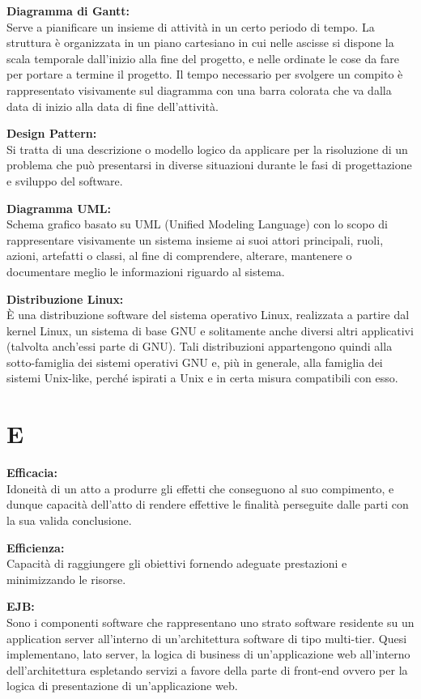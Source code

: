 \documentclass[a4paper, oneside, openany, dvipsnames, table]{article}
\begin{document}
\textbf{Diagramma di Gantt:}\\	Serve a pianificare un insieme di attività in un certo periodo di tempo. La struttura è organizzata in un piano cartesiano in cui nelle ascisse si dispone la scala temporale dall’inizio alla fine del progetto, e nelle ordinate le cose da fare per portare a termine il progetto. Il tempo necessario per svolgere un compito è rappresentato visivamente sul diagramma con una barra colorata che va dalla data di inizio alla data di fine dell’attività.

\textbf{Design Pattern:} \\	Si tratta di una descrizione o modello logico da applicare per la risoluzione di un problema che può presentarsi in diverse situazioni durante le fasi di progettazione e sviluppo del software.

\textbf{Diagramma UML:}\\	Schema grafico basato su UML (Unified Modeling Language) con lo scopo di rappresentare visivamente un sistema insieme ai suoi attori principali, ruoli, azioni, artefatti o classi, al fine di comprendere, alterare, mantenere o documentare meglio le informazioni riguardo al sistema.

\textbf{Distribuzione Linux:}\\	\`E una distribuzione software del sistema operativo Linux, realizzata a partire dal kernel Linux, un sistema di base GNU e solitamente anche diversi altri applicativi (talvolta anch'essi parte di GNU). Tali distribuzioni appartengono quindi alla sotto-famiglia dei sistemi operativi GNU e, più in generale, alla famiglia dei sistemi Unix-like, perché ispirati a Unix e in certa misura compatibili con esso.


\newpage
\section{E}
\textbf{Efficacia:}\\	Idoneità di un atto a produrre gli effetti che conseguono al suo compimento, e dunque capacità dell'atto di rendere effettive le finalità perseguite dalle parti con la sua valida conclusione. 

\textbf{Efficienza:}\\ Capacità di raggiungere gli obiettivi fornendo adeguate prestazioni e minimizzando le risorse.

\textbf{EJB:}\\	Sono i componenti software che rappresentano uno strato software residente su un application server all'interno di un'architettura software di tipo multi-tier. Quesi implementano, lato server, la logica di business di un'applicazione web all'interno dell'architettura espletando servizi a favore della parte di front-end ovvero per la logica di presentazione di un'applicazione web.
\end{document}
